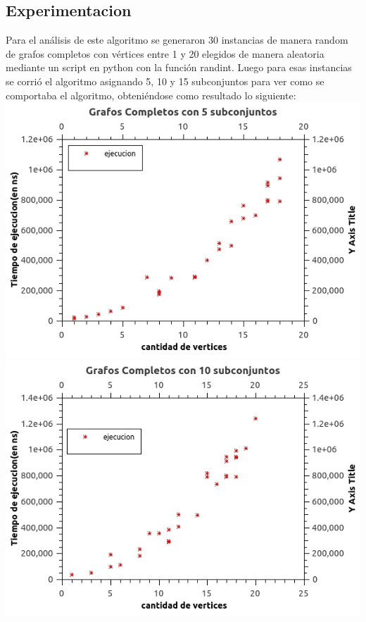 \subsection{Experimentacion}
Para el análisis de este algoritmo se generaron 30 instancias de manera random de grafos completos con vértices entre 1 y 20 elegidos de manera aleatoria mediante un script en python con la función randint.
Luego para esas instancias se corrió el algoritmo asignando 5, 10 y 15 subconjuntos para ver como se comportaba el algoritmo, obteniéndose como resultado lo siguiente:\\
\includegraphics[scale=0.5]{Ej2/k5.jpg}
\includegraphics[scale=0.5]{Ej2/k10.jpg}\\
